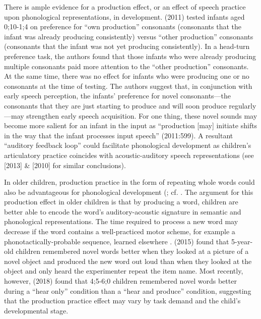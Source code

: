 \documentclass[a4paper,man,natbib,donotrepeattitle, apacite]{apa6}
\begin{document}
There is ample evidence for a production effect, or an effect of speech practice upon phonological representations, in development. \citeauthor{depaolisProductionPatternsInfluence2011} (2011) tested infants aged 0;10-1;4 on preference for ``own production'' consonants (consonants that the infant was already producing consistently) versus ``other production'' consonants (consonants that the infant was not yet producing consistently). In a head-turn preference task, the authors found that those infants who were already producing multiple consonants paid more attention to the ``other production'' consonants. At the same time, there was no effect for infants who were producing one or no consonants at the time of testing. The authors suggest that, in conjunction with early speech perception, the infants’ preference for novel consonants---the consonants that they are just starting to produce and will soon produce regularly---may strengthen early speech acquisition. For one thing, these novel sounds may become more salient for an infant in the input as ``production [may] initiate shifts in the way that the infant processes input speech'' (2011:599). A resultant ``auditory feedback loop'' \cite{majoranoRelationshipInfantsProduction2014} could facilitate phonological development as children’s articulatory practice coincides with acoustic-auditory speech representations (see \citeauthor{depaolisInfluenceBabblingPatterns2013} [2013] \& \citeauthor{keren-portnoyRoleVocalPractice2010} [2010] for similar conclusions). 

In older children, production practice in the form of repeating whole words could also be advantageous for phonological development (; cf. . The argument for this production effect in older children is that by producing a word, children are better able to encode the word’s auditory-acoustic signature in semantic and phonological representations. The time required to process a new word may decrease if the word contains a well-practiced motor scheme, for example a phonotactically-probable sequence, learned elsewhere \cite{storkelComparisonHomonymNovel2005,storkelInfluencePartwordPhonotactic2011}. \citeauthor{ichtProductionEffectMemory2015} (2015) found that 5-year-old children remembered novel words better when they looked at a picture of a novel object and produced the new word out loud than when they looked at the object and only heard the experimenter repeat the item name. Most recently, however, \citeauthor{zamunerReverseProductionEffect2018} (2018) found that 4;5-6;0 children remembered novel words better during a ``hear only'' condition than a ``hear and produce'' condition, suggesting that the production practice effect may vary by task demand and the child’s developmental stage. 
\end{document}
